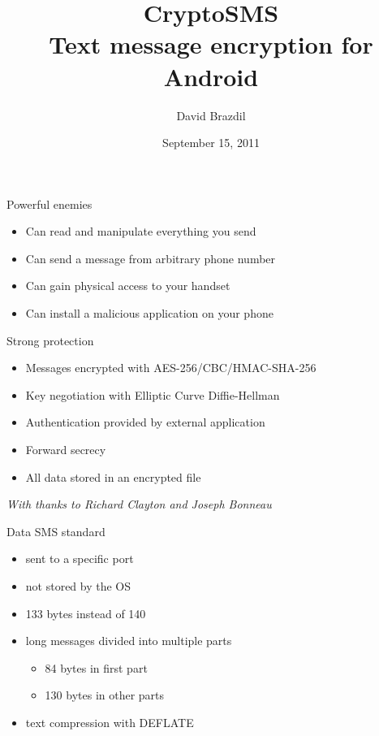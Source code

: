 \documentclass{beamer}
\title[CryptoSMS]{CryptoSMS\\Text message encryption for Android}
\author{David Brazdil}
\institute{University of Cambridge}
\date{September 15, 2011}
\begin{document}
%

\begin{frame}
	\titlepage
\end{frame}


\begin{frame}{Powerful enemies}
	\begin{itemize}
		\item{Can read and manipulate everything you send}
		\item{Can send a message from arbitrary phone number}
		\item{Can gain physical access to your handset}
		\item{Can install a malicious application on your phone}
	\end{itemize}
\end{frame}

\begin{frame}{Strong protection}
	\vfill
	\begin{itemize}
		\item{Messages encrypted with AES-256/CBC/HMAC-SHA-256}
		\item{Key negotiation with Elliptic Curve Diffie-Hellman}
		\item{Authentication provided by external application}
		\item{Forward secrecy}
		\item{All data stored in an encrypted file}
	\end{itemize}
	\vfill
	\begin{flushright}
	\emph{With thanks to Richard Clayton and Joseph Bonneau}
	\end{flushright}
\end{frame}



\begin{frame}{Data SMS standard}
	\begin{itemize}
		\item{sent to a specific port}
		\item{not stored by the OS}
		\item{133 bytes instead of 140}
		\item{long messages divided into multiple parts}
		\begin{itemize}
			\item{84 bytes in first part}
			\item{130 bytes in other parts}
		\end{itemize}
		\item{text compression with DEFLATE}
	\end{itemize}
\end{frame}
\end{document}
